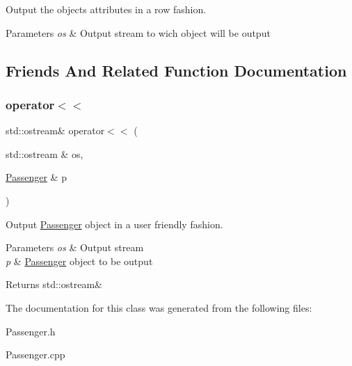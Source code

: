 Output the object\textquotesingle{}s attributes in a row fashion. 


\begin{DoxyParams}{Parameters}
{\em os} & Output stream to wich object will be output \\
\hline
\end{DoxyParams}


\subsection{Friends And Related Function Documentation}
\mbox{\label{classPassenger_a7b1aeaded08562578690b788f39db888}} 
\subsubsection{\texorpdfstring{operator$<$$<$}{operator<<}}
{\footnotesize\ttfamily std\+::ostream\& operator$<$$<$ (\begin{DoxyParamCaption}\item[{std\+::ostream \&}]{os,  }\item[{\mbox{\hyperlink{classPassenger}{Passenger}} \&}]{p }\end{DoxyParamCaption})\hspace{0.3cm}{\ttfamily [friend]}}



Output \mbox{\hyperlink{classPassenger}{Passenger}} object in a user friendly fashion. 


\begin{DoxyParams}{Parameters}
{\em os} & Output stream \\
\hline
{\em p} & \mbox{\hyperlink{classPassenger}{Passenger}} object to be output \\
\hline
\end{DoxyParams}
\begin{DoxyReturn}{Returns}
std\+::ostream\& 
\end{DoxyReturn}


The documentation for this class was generated from the following files\+:\begin{DoxyCompactItemize}
\item 
Passenger.\+h\item 
Passenger.\+cpp\end{DoxyCompactItemize}
